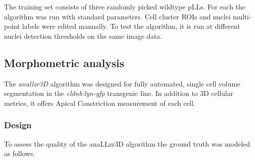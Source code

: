 \documentclass[10pt, b5paper, singlespacinge, twoside]{reedthesis} %
\theoremstyle{definition}
\theoremstyle{definition}
\theoremstyle{definition}
\theoremstyle{remark}
\begin{document}
The training set consists of three randomly picked wildtype pLLs. For each the algorithm was run with standard parameters. Cell cluster ROIs and nuclei multi-point labels were edited manually. To test the algorithm, it is run at different nuclei detection thresholds on the same image data.

\hypertarget{morphometric-analysis}{%
\subsection{Morphometric analysis}\label{morphometric-analysis}}

The \emph{anallzr3D} algorithm was designed for fully automated, single cell volume segmentation in the \emph{cldnb:lyn-gfp} transgenic line. In addition to 3D cellular metrics, it offers Apical Constriction measurement of each cell.

\hypertarget{design-1}{%
\subsubsection{Design}\label{design-1}}

To assess the quality of the anaLLzr3D algorithm the ground truth was modeled as follows.
\end{document}
